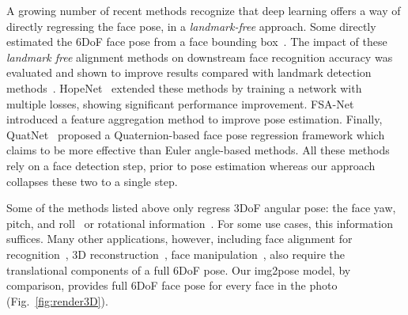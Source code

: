 \documentclass[final]{cvpr}
\begin{document}
\begin{figure}[!t]
\end{figure}

A growing number of recent methods recognize that deep learning offers a way of directly regressing the face pose, in a {\em landmark-free} approach. Some directly estimated the 6DoF face pose from a face bounding box~\cite{chang2018expnet,chang2019deep,faceposenet,kuhnke2019deep,mustikovela2020self,hopenet,fsanet}. The impact of these {\em landmark free} alignment methods on downstream face recognition accuracy was evaluated and shown to improve results compared with landmark detection methods~\cite{chang2019deep, faceposenet}. HopeNet~\cite{hopenet} extended these methods by training a network with multiple losses, showing significant performance improvement. FSA-Net~\cite{fsanet} introduced a feature aggregation method to improve pose estimation. 
Finally, QuatNet~\cite{quatnet} proposed a Quaternion-based face pose regression framework which claims to be more effective than Euler angle-based methods. 
All these methods rely on a face detection step, prior to pose estimation whereas our approach collapses these two to a single step.

Some of the methods listed above only regress 3DoF angular pose: the face yaw, pitch, and roll~\cite{hopenet, fsanet} or rotational information~\cite{quatnet}. For some use cases, this information suffices. Many other applications, however, including face alignment for recognition~\cite{hassner2015effective,masi2017rapid,masi2016we,masi2019face,wang2018cosface,wolf2011face}, 3D reconstruction~\cite{feng2018joint, tuan2017regressing,tuan2018extreme}, face manipulation~\cite{nirkin2019fsgan,nirkin2018face,nirkin2020deepfake}, also require the translational components of a full 6DoF pose. Our img2pose model, by comparison, provides full 6DoF face pose for every face in the photo (Fig.~\ref{fig:render3D}). 
\end{document}
